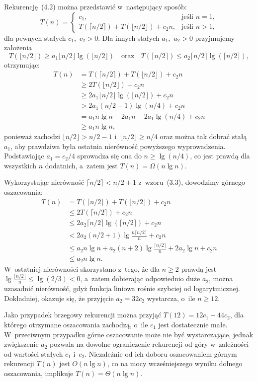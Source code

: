 \exercise %
Rekurencję~(4.2) można przedstawić w~następujący sposób:
\[
	T(n) =
	\begin{cases}
		c_1, & \text{jeśli $n=1$}, \\
		T(\lceil n/2\rceil)+T(\lfloor n/2\rfloor)+c_2n, & \text{jeśli $n>1$},
	\end{cases}
\]
dla pewnych stałych $c_1$,~$c_2>0$. Dla innych stałych $a_1$,~$a_2>0$ przyjmujemy założenia
\[
	T(\lfloor n/2\rfloor) \ge a_1\lfloor n/2\rfloor\lg(\lfloor n/2\rfloor) \quad\text{oraz}\quad T(\lceil n/2\rceil) \le a_2\lceil n/2\rceil\lg(\lceil n/2\rceil),
\]
otrzymując:
\begin{align*}
	T(n) &= T(\lceil n/2\rceil)+T(\lfloor n/2\rfloor)+c_2n \\
 	&\ge 2T(\lfloor n/2\rfloor)+c_2n \\
 	&\ge 2a_1\lfloor n/2\rfloor\lg(\lfloor n/2\rfloor)+c_2n \\
 	&> 2a_1(n/2-1)\lg(n/4)+c_2n \\
 	&= a_1n\lg n-2a_1n-2a_1\lg(n/4)+c_2n \\
 	&\ge a_1n\lg n,
\end{align*}
ponieważ zachodzi $\lfloor n/2\rfloor>n/2-1$ i~$\lfloor n/2\rfloor\ge n/4$ oraz można tak dobrać stałą $a_1$, aby prawdziwa była ostatnia nierówność powyższego wyprowadzenia. Podstawiając $a_1=c_2/4$ sprowadza się ona do $n\ge\lg(n/4)$, co jest prawdą dla wszystkich $n$ dodatnich, a~zatem jest $T(n)=\Omega(n\lg n)$.

Wykorzystując nierówność $\lceil n/2\rceil<n/2+1$ z~wzoru~(3.3), dowodzimy górnego oszacowania:
\begin{align*}
	T(n) &= T(\lceil n/2\rceil)+T(\lfloor n/2\rfloor)+c_2n \\
	&\le 2T(\lceil n/2\rceil)+c_2n \\
	&\le 2a_2\lceil n/2\rceil\lg(\lceil n/2\rceil)+c_2n \\
	&< 2a_2(n/2+1)\lg\frac{n\lceil n/2\rceil}{n}+c_2n \\
	&\le a_2n\lg n+a_2(n+2)\lg\frac{\lceil n/2\rceil}{n}+2a_2\lg n+c_2n \\
	&\le a_2n\lg n.
\end{align*}
W~ostatniej nierówności skorzystano z~tego, że dla $n\ge2$ prawdą jest $\lg\frac{\lceil n/2\rceil}{n}\le\lg(2/3)<0$, a~zatem dobierając odpowiednio duże $a_2$, można uzasadnić nierówność, gdyż funkcja liniowa rośnie szybciej od logarytmicznej. Dokładniej, okazuje się, że przyjęcie $a_2=32c_2$ wystarcza, o~ile $n\ge12$.

Jako przypadek brzegowy rekurencji można przyjąć $T(12)=12c_1+44c_2$, dla którego otrzymane oszacowania zachodzą, o~ile $c_1$ jest dostatecznie małe. W~przeciwnym przypadku górne oszacowanie może nie być wystarczające, jednak zwiększenie $a_2$ pozwala na dowolne ograniczenie rekurencji od góry w~zależności od wartości stałych $c_1$ i~$c_2$. Niezależnie od ich doboru oszacowaniem górnym rekurencji $T(n)$ jest $O(n\lg n)$, co na mocy wcześniejszego wyniku dolnego oszacowania, implikuje $T(n)=\Theta(n\lg n)$.

